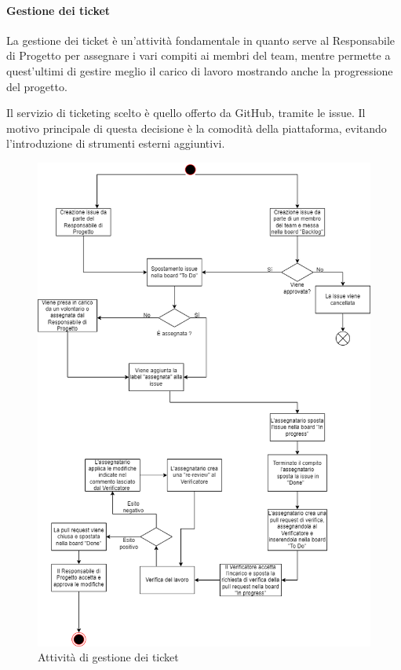 \paragraph{Gestione dei ticket}
La gestione dei ticket è un'attività fondamentale in quanto serve al Responsabile di Progetto per assegnare i vari compiti ai membri del team, mentre permette a quest'ultimi di gestire meglio il carico di lavoro mostrando anche la progressione del progetto.

Il servizio di ticketing scelto è quello offerto da GitHub, tramite le issue. Il motivo principale di questa decisione è la comodità della piattaforma, evitando l'introduzione di strumenti esterni aggiuntivi.

\begin{figure}[!h]
\centering
\includegraphics[scale=0.5]{Contenuto/Immagini/ticket.png}
\caption{Attività di gestione dei ticket}
\end{figure}

